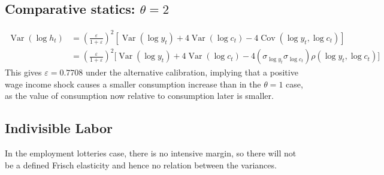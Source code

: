\documentclass[11pt]{amsart}
\begin{document}
\subsection{Comparative statics: $\theta = 2$}
\begin{align*}
\operatorname{Var}(\log h_t) & = \left( \frac{\varepsilon}{1+ \varepsilon}\right)^2 \left[ \operatorname{Var}(\log y_t) +  4 \operatorname{Var}(\log c_t) - 4 \operatorname{Cov}(\log y_t, \log c_t) \right] \\
& = \left( \frac{\varepsilon}{1+ \varepsilon}\right)^2 \Bigg[ \operatorname{Var}(\log y_t) + 4 \operatorname{Var}(\log c_t) - 4 \left(  \sigma_{\log y_t} \sigma_{\log c_t} \right)\rho(\log y_t, \log c_t) \Bigg]
\end{align*}
This gives $\varepsilon = 0.7708$ under the alternative calibration, implying that a positive wage income shock causes a smaller consumption increase than in the $\theta=1$ case, as the value of consumption now relative to consumption later is smaller.

\subsection{Indivisible Labor}
In the employment lotteries case, there is no intensive margin, so there will not be a defined Frisch elasticity and hence no relation between the variances.
\end{document}
